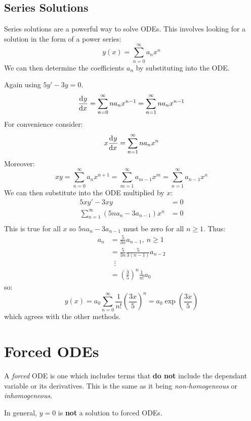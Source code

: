 \documentclass[../main.tex]{subfiles}
\begin{document}
\subsection{Series Solutions}
Series solutions are a powerful way to solve ODEs.
This involves looking for a solution in the form of a power series:
\[
  y(x) = \sum_{n=0}^{\infty} a_n x^{n}
\]
We can then determine the coefficients $a_n$ by substituting into the ODE.
\begin{example}
  Again using $5y' - 3y = 0$.
  \[
    \deriv{y}{x} = \sum_{n=0}^{\infty} na_n x^{n-1} = \sum_{n=1}^{\infty} na_nx^{n-1}
  \]
  For convenience consider:
  \[
    x \deriv{y}{x} = \sum_{n=1}^{\infty} na_n x^{n}
  \]
  Moreover:
  \[
    xy = \sum_{n=0}^{\infty} a_n x^{n + 1} = \sum_{m = 1}^{\infty} a_{m-1}x^{m} = \sum_{n = 1}^{\infty} a_{n-1}x^{n}
  \]
  We can then substitute into the ODE multiplied by $x$:
  \begin{align*}
    5xy' - 3xy &= 0 \\
    \sum_{n=1}^{\infty} (5na_n - 3a_{n-1})x^{n} &= 0 \\
  \end{align*}
  This is true for all $x$ so $5na_n -3a_{n-1}$ must be zero for all $n\geq1$.
  Thus:
  \begin{align*}
    a_n &= \frac{5}{3n}a_{n-1},\ n\geq1 \\
        &= \frac{5}{3n}\frac{5}{3(n-1)}a_{n-2} \\
        &\;\;\vdots \\
        &= \left(\frac{3}{5}\right)^{n} \frac{1}{n!}a_0
  \end{align*}
  so:
  \[
    y(x) = a_0 \sum_{n=0}^{\infty} \frac{1}{n!}\left(\frac{3x}{5}\right)^{n} = a_0 \exp\left(\frac{3x}{5}\right)
  \]
  which agrees with the other methods.
\end{example}
\section{Forced ODEs}
\begin{definition}[Forced]
  A \textit{forced} ODE is one which includes terms that \textbf{do not} include the dependant variable or its derivatives.
  This is the same as it being \textit{non-homogeneous} or \textit{inhomogeneous}.
\end{definition}
\begin{remark}
  In general, $y = 0$ is \textbf{not} a solution to forced ODEs.
\end{remark}
\end{document}

